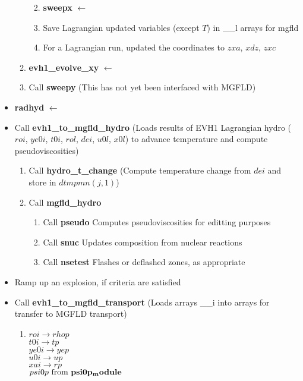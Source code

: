 \documentclass[11pt,doublespace]{article}
\begin{document}
\begin{itemize}
\begin{enumerate}
\begin{enumerate}
\begin{enumerate}
\begin{enumerate}
\end{enumerate}
\end{enumerate}
  \item {\bf sweepx} $\leftarrow$
  \item Save Lagrangian updated variables (except $T$) in \_\_l arrays for mgfld
  \item For a Lagrangian run, updated the coordinates to $zxa$, $xdz$, $zxc$
\end{enumerate}
  \item {\bf evh1\_evolve\_xy} $\leftarrow$
  \item Call {\bf sweepy} (This has not yet been interfaced with MGFLD)
\end{enumerate}
  \item {\bf radhyd} $\leftarrow$
  \item Call {\bf evh1\_to\_mgfld\_hydro} (Loads results of EVH1 Lagrangian hydro ($roi$, $ye0i$, $t0i$, $rol$, $dei$, $u0l$, $x0l$) to advance temperature and compute pseudoviscosities)
\begin{enumerate}
  \item Call {\bf hydro\_t\_change} (Compute temperature change from $dei$ and store in $dtmpmn(j,1)$)
  \item Call {\bf mgfld\_hydro}
\begin{enumerate}
  \item Call {\bf pseudo} Computes pseudoviscosities for editting purposes
  \item Call {\bf snuc} Updates composition from nuclear reactions
  \item Call {\bf nsetest} Flashes or deflashed zones, as appropriate
\end{enumerate}
\end{enumerate}
  \item Ramp up an explosion, if criteria are satisfied
  \item Call {\bf evh1\_to\_mgfld\_transport} (Loads arrays \_\_i into arrays for transfer to MGFLD transport)
\begin{enumerate}
  \item $roi \rightarrow rhop$\\
           $t0i \rightarrow tp$\\
           $ye0i \rightarrow yep$\\
           $u0i \rightarrow up$\\
           $xai \rightarrow rp$\\
           $psi0p \mbox{ from } {\bf psi0p_module}$\\

\end{enumerate}
\end{itemize}
\end{document}
